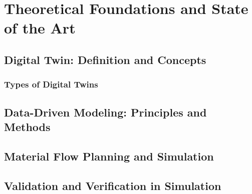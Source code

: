 \chapter{Theoretical Foundations and State of the Art}
\label{chap:theory}

\section{Digital Twin: Definition and Concepts}
\subsection{Types of Digital Twins}


\section{Data-Driven Modeling: Principles and Methods}

\section{Material Flow Planning and Simulation}
\section{Validation and Verification in Simulation}
